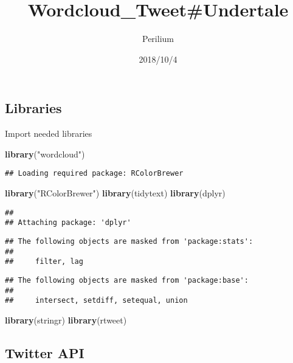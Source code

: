 \documentclass[]{article}
\title{Wordcloud\_Tweet\#Undertale}
\author{Perilium}
\date{2018/10/4}
\newenvironment{Shaded}{\begin{snugshade}}{\end{snugshade}}
\newcommand{\KeywordTok}[1]{\textcolor[rgb]{0.13,0.29,0.53}{\textbf{#1}}}
\newcommand{\StringTok}[1]{\textcolor[rgb]{0.31,0.60,0.02}{#1}}
\newcommand{\NormalTok}[1]{#1}
\begin{document}
\maketitle

\subsection{Libraries}\label{libraries}

Import needed libraries

\begin{Shaded}
\begin{Highlighting}[]
\KeywordTok{library}\NormalTok{(}\StringTok{"wordcloud"}\NormalTok{)}
\end{Highlighting}
\end{Shaded}

\begin{verbatim}
## Loading required package: RColorBrewer
\end{verbatim}

\begin{Shaded}
\begin{Highlighting}[]
\KeywordTok{library}\NormalTok{(}\StringTok{"RColorBrewer"}\NormalTok{)}
\KeywordTok{library}\NormalTok{(tidytext)}
\KeywordTok{library}\NormalTok{(dplyr)}
\end{Highlighting}
\end{Shaded}

\begin{verbatim}
## 
## Attaching package: 'dplyr'
\end{verbatim}

\begin{verbatim}
## The following objects are masked from 'package:stats':
## 
##     filter, lag
\end{verbatim}

\begin{verbatim}
## The following objects are masked from 'package:base':
## 
##     intersect, setdiff, setequal, union
\end{verbatim}

\begin{Shaded}
\begin{Highlighting}[]
\KeywordTok{library}\NormalTok{(stringr)}
\KeywordTok{library}\NormalTok{(rtweet)}
\end{Highlighting}
\end{Shaded}

\subsection{Twitter API}\label{twitter-api}
\end{document}
